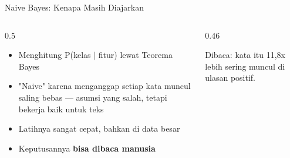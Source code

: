 \documentclass[aspectratio=169,t]{beamer}
\begin{document}
\begin{frame}{Naive Bayes: Kenapa Masih Diajarkan}
  \begin{columns}[T]
    \begin{column}{0.5\textwidth}
      \begin{itemize}
        \footnotesize
        \item Menghitung P(kelas $\mid$ fitur) lewat Teorema Bayes
        \item "Naive" karena menganggap setiap kata muncul saling bebas ---
              asumsi yang salah, tetapi bekerja baik untuk teks
        \item Latihnya sangat cepat, bahkan di data besar
        \item Keputusannya \textbf{bisa dibaca manusia}
      \end{itemize}
    \end{column}
    \begin{column}{0.46\textwidth}
      \begin{center}
      \end{center}
      \vspace{0.2em}
      {\footnotesize\color{nvgray}Dibaca: kata itu 11,8x lebih sering muncul di ulasan positif.}
    \end{column}
  \end{columns}
\end{frame}
\end{document}
